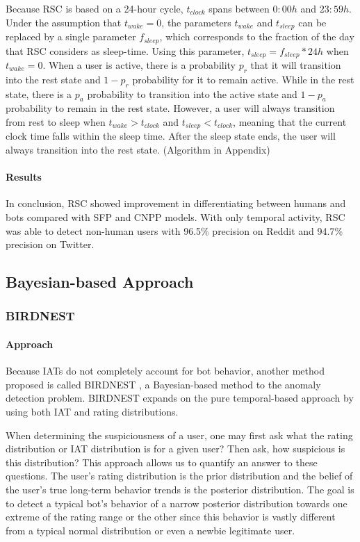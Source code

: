 \documentclass[11pt, oneside]{article}   	%
\begin{document}
\quad Because RSC is based on a 24-hour cycle, $t_{clock}$ spans between $0:00h$ and $23:59h$.
Under the assumption that $t_{wake}=0$, the parameters $t_{wake}$ and $t_{sleep}$ can be replaced by a single parameter $f_{sleep}$, which corresponds to the fraction of the day that RSC considers as sleep-time.
Using this parameter, $t_{sleep}=f_{sleep}*24h$ when $t_{wake}=0$.
When a user is active, there is a probability $p_r$ that it will transition into the rest state and $1-p_r$ probability for it to remain active.
While in the rest state, there is a $p_a$ probability to transition into the active state and $1-p_a$ probability to remain in the rest state.
However, a user will always transition from rest to sleep when $t_{wake} > t_{clock}$ and $t_{sleep} < t_{clock}$, meaning that the current clock time falls within the sleep time.
After the sleep state ends, the user will always transition into the rest state. (Algorithm in Appendix)

\paragraph*{Results}
\quad

\quad In conclusion, RSC showed improvement in differentiating between humans and bots compared with SFP and CNPP models.
With only temporal activity, RSC was able to detect non-human users with 96.5\% precision on Reddit and 94.7\% precision on Twitter.

\subsection{Bayesian-based Approach}
\subsubsection*{BIRDNEST }

\paragraph*{Approach}
\quad

\quad Because IATs do not completely account for bot behavior, another method proposed is called BIRDNEST \cite{birdnest}, a Bayesian-based method to the anomaly detection problem. 
BIRDNEST expands on the pure temporal-based approach by using both IAT and rating distributions.

\quad When determining the suspiciousness of a user, one may first ask what the rating distribution or IAT distribution is for a given user? Then ask, how suspicious is this distribution? This approach allows us to quantify an answer to these questions. 
The user's rating distribution is the prior distribution and the belief of the user's true long-term behavior trends is the posterior distribution.
The goal is to detect a typical bot's behavior of a narrow posterior distribution towards one extreme of the rating range or the other since this behavior is vastly different from a typical normal distribution or even a newbie legitimate user.
\end{document}
